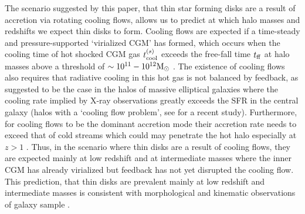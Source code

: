 \documentclass[fleqn,usenatbib]{mnras}
\newcommand{\msun}{{\rm M}_\odot}
\begin{document}
\newcommand{\tcoolsh}{t_{\rm cool}^{(s)}}
\newcommand{\tff}{t_{\rm ff}}
\newcommand{\Mvir}{M_{\rm vir}}


The scenario suggested by this paper, that thin star forming disks are a result of accretion via rotating cooling flows, allows us to predict at which halo masses and redshifts we expect thin disks to form.
Cooling flows are expected if a time-steady and pressure-supported `virialized CGM' has formed, which occurs when the cooling time of hot shocked CGM gas $\tcoolsh$ exceeds the free-fall time $\tff$ at halo masses above a threshold of $\sim10^{11}-10^{12}\msun$ \citep[e.g.,][]{White1978, White1991, Birnboim2003}. The existence of cooling flows also requires that 
radiative cooling in this hot gas is not balanced by feedback, as suggested to be the case in the halos of massive elliptical galaxies where the cooling rate implied by X-ray observations greatly exceeds the SFR in the central galaxy (halos with a `cooling flow problem', see \citealt{McDonald18} for a recent study).
Furthermore, for cooling flows to be the dominant accretion mode their accretion rate needs to exceed that of cold streams which could may penetrate the hot halo especially at $z>1$ \cite[e.g.,][]{Keres2005,Dekel2006, Dekel2009}. Thus, in the scenario where thin disks are a result of cooling flows, they are expected mainly at low redshift and at intermediate masses where the inner CGM has already virialized but feedback has not yet disrupted the cooling flow.  This prediction, that thin disks are prevalent mainly at low redshift and intermediate masses is consistent with morphological and kinematic observations of galaxy sample \citep[e.g.,][]{Kassin2012, vanderwel2014}. 
\end{document}
